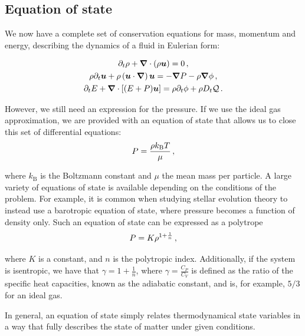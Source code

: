 \subsection{Equation of state} \label{sec:fluid_eos}

We now have a complete set of conservation equations for mass, momentum and energy, describing the dynamics of a fluid in Eulerian form:

\begin{boxedeq}
    \begin{gather}
        \partial_t \rho + \boldsymbol{\nabla} \cdot (\rho \boldsymbol{u}) = 0 \,\mathrm{,} \\
        \rho \partial_t \boldsymbol{u} + \rho \left( \boldsymbol{u} \cdot \boldsymbol{\nabla} \right) \boldsymbol{u} = - \boldsymbol{\nabla} P - \rho \boldsymbol{\nabla} \phi \,\mathrm{,} \\
        \partial_t E + \boldsymbol{\nabla} \cdot \left[ (E + P) \boldsymbol{u} \right] = \rho \partial_t \phi + \rho D_t \mathcal{Q} \,\mathrm{.}
    \end{gather}
\end{boxedeq}

However, we still need an expression for the pressure. If we use the ideal gas approximation, we are provided with an equation of state that allows us to close this set of differential equations:
\begin{equation}
    P = \frac{\rho k_\mathrm{B} T}{\mu} \,\mathrm{,}
\end{equation}

where \(k_\mathrm{B}\) is the Boltzmann constant and \(\mu\) the mean mass per particle. A large variety of equations of state is available depending on the conditions of the problem. For example, it is common when studying stellar evolution theory to instead use a barotropic equation of state, where pressure becomes a function of density only. Such an equation of state can be expressed as a polytrope
\begin{equation}
    P = K \rho^{1 + \frac{1}{n}} \,\mathrm{,}
\end{equation}

where \(K\) is a constant, and \(n\) is the polytropic index. Additionally, if the system is isentropic, we have that \(\gamma = 1 + \frac{1}{n}\), where \(\gamma = \frac{C_P}{C_V}\) is defined as the ratio of the specific heat capacities, known as the adiabatic constant, and is, for example, \(5/3\) for an ideal gas.

In general, an equation of state simply relates thermodynamical state variables in a way that fully describes the state of matter under given conditions.

